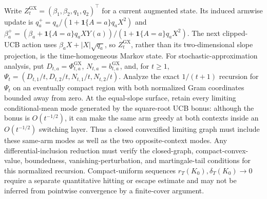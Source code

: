 Write \(Z^{\mathrm{GX}}_t=(\beta_1,\beta_2,q_1,q_2)^\top\) for a current augmented state. Its induced armwise update is \(q_a^+=q_a/(1+\mathbf 1\{A=a\}q_aX^2)\) and \(\beta_a^+=(\beta_a+\mathbf 1\{A=a\}q_aXY(a))/(1+\mathbf 1\{A=a\}q_aX^2)\). The next clipped-UCB action uses \(\beta_aX+|X|\sqrt{q_a}\), so \(Z^{\mathrm{GX}}_t\), rather than its two-dimensional slope projection, is the time-homogeneous Markov state. For stochastic-approximation analysis, put \(D_{t,a}=\Phi^{\mathrm{GX}}_{t,a}\), \(N_{t,a}=b^{\mathrm{GX}}_{t,a}\), and, for \(t\ge1\), \(\Psi_t=(D_{t,1}/t,D_{t,2}/t,N_{t,1}/t,N_{t,2}/t)\). Analyze the exact \(1/(t+1)\) recursion for \(\Psi_t\) on an eventually compact region with both normalized Gram coordinates bounded away from zero. At the equal-slope surface, retain every limiting conditional-mean mode generated by the square-root UCB bonus: although the bonus is \(O(t^{-1/2})\), it can make the same arm greedy at both contexts inside an \(O(t^{-1/2})\) switching layer. Thus a closed convexified limiting graph must include these same-arm modes as well as the two opposite-context modes. Any differential-inclusion reduction must verify the closed-graph, compact-convex-value, boundedness, vanishing-perturbation, and martingale-tail conditions for this normalized recursion. Compact-uniform sequences \(r_T(K_0),\delta_T(K_0)\to0\) require a separate quantitative hitting or escape estimate and may not be inferred from pointwise convergence by a finite-cover argument.
